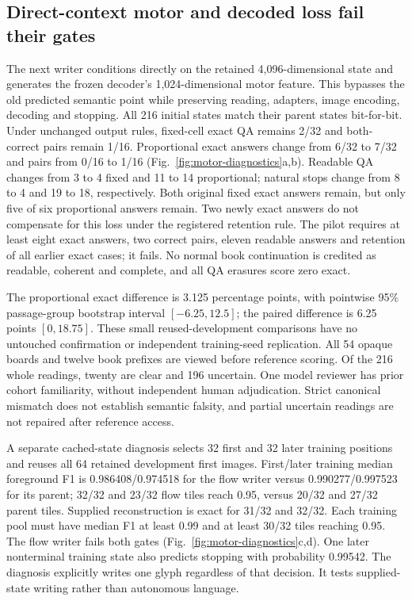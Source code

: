 \subsection*{Direct-context motor and decoded loss fail their gates}
The next writer conditions directly on the retained 4,096-dimensional state
and generates the frozen decoder's 1,024-dimensional motor feature. This
bypasses the old predicted semantic point while preserving reading, adapters,
image encoding, decoding and stopping. All 216 initial states match their
parent states bit-for-bit. Under unchanged output rules, fixed-cell exact QA
remains 2/32 and both-correct pairs remain 1/16. Proportional exact answers
change from 6/32 to 7/32 and pairs from 0/16 to 1/16
(Fig.~\ref{fig:motor-diagnostics}a,b). Readable QA changes from 3 to 4 fixed
and 11 to 14 proportional; natural stops change from 8 to 4 and 19 to 18,
respectively. Both original fixed exact answers remain, but only five of six
proportional answers remain. Two newly exact answers do not compensate for
this loss under the registered retention rule. The pilot requires at least
eight exact answers, two correct pairs, eleven readable answers and retention
of all earlier exact cases; it fails. No normal book continuation is credited
as readable, coherent and complete, and all QA erasures score zero exact.

The proportional exact difference is 3.125 percentage points, with pointwise
95\% passage-group bootstrap interval $[-6.25,12.5]$; the paired difference is
6.25 points $[0,18.75]$. These small reused-development comparisons have no
untouched confirmation or independent training-seed replication. All 54 opaque
boards and twelve book prefixes are viewed before reference scoring. Of the
216 whole readings, twenty are clear and 196 uncertain. One model reviewer
has prior cohort familiarity, without independent human adjudication. Strict
canonical mismatch does not establish semantic falsity, and partial uncertain
readings are not repaired after reference access.

A separate cached-state diagnosis selects 32 first and 32 later training
positions and reuses all 64 retained development first images. First/later
training median foreground F1 is 0.986408/0.974518 for the flow writer versus
0.990277/0.997523 for its parent; 32/32 and 23/32 flow tiles reach 0.95,
versus 20/32 and 27/32 parent tiles. Supplied reconstruction is exact for
31/32 and 32/32. Each training pool must have median F1 at least 0.99 and at
least 30/32 tiles reaching 0.95. The flow writer fails both gates
(Fig.~\ref{fig:motor-diagnostics}c,d). One later nonterminal training state
also predicts stopping with probability 0.99542. The diagnosis explicitly
writes one glyph regardless of that decision. It tests supplied-state
writing rather than autonomous language.

